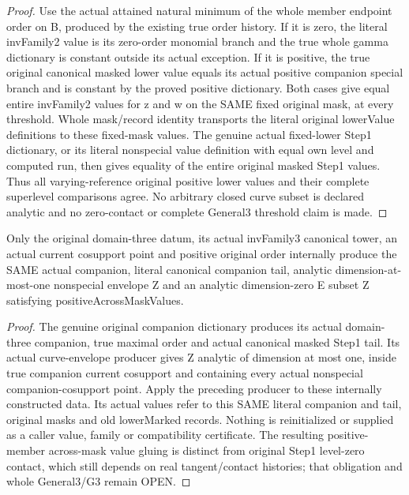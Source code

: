 \begin{proof}
Use the actual attained natural minimum of the whole member endpoint order
on B, produced by the existing true order history. If it is zero, the
literal invFamily2 value is its zero-order monomial branch and the true whole
gamma dictionary is constant outside its actual exception. If it is positive,
the true original canonical masked lower value equals its actual positive
companion special branch and is constant by the proved positive dictionary.
Both cases give equal entire invFamily2 values for z and w on the SAME fixed
original mask, at every threshold. Whole mask/record identity transports the
literal original lowerValue definitions to these fixed-mask values. The
genuine actual fixed-lower Step1 dictionary, or its literal nonspecial value
definition with equal own level and computed run, then gives equality of
the entire original masked Step1 values. Thus all varying-reference original
positive lower values and their complete superlevel comparisons agree.
No arbitrary closed curve subset is declared analytic and no zero-contact
or complete General3 threshold claim is made.
\end{proof}

\begin{theorem}
\label{hir:member-across-mask-original-general-three-consumer}
\leanok
{}
Only the original domain-three datum, its actual invFamily3 canonical tower,
an actual current cosupport point and positive original order internally
produce the SAME actual companion, literal canonical companion tail,
analytic dimension-at-most-one nonspecial envelope Z and an analytic
dimension-zero E subset Z satisfying positiveAcrossMaskValues.
\end{theorem}
\begin{proof}
The genuine original companion dictionary produces its actual domain-three
companion, true maximal order and actual canonical masked Step1 tail. Its
actual curve-envelope producer gives Z analytic of dimension at most one,
inside true companion current cosupport and containing every actual
nonspecial companion-cosupport point. Apply the preceding producer to these
internally constructed data. Its actual values refer to this SAME literal
companion and tail, original masks and old lowerMarked records. Nothing is
reinitialized or supplied as a caller value, family or compatibility
certificate. The resulting positive-member across-mask value gluing is
distinct from original Step1 level-zero contact, which still depends on real
tangent/contact histories; that obligation and whole General3/G3 remain OPEN.
\end{proof}

